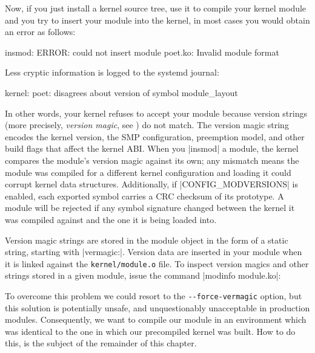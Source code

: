 \documentclass[10pt, oneside]{book}
\begin{document}
Now, if you just install a kernel source tree, use it to compile your kernel module and you try to insert your module into the kernel,
in most cases you would obtain an error as follows:

\begin{codebash}
insmod: ERROR: could not insert module poet.ko: Invalid module format
\end{codebash}

Less cryptic information is logged to the systemd journal:

\begin{codebash}
kernel: poet: disagrees about version of symbol module_layout
\end{codebash}

In other words, your kernel refuses to accept your module because version strings (more precisely, \textit{version magic}, see ) do not match.
The version magic string encodes the kernel version, the SMP configuration, preemption model, and other build flags that affect the kernel ABI.
When you \sh|insmod| a module, the kernel compares the module's version magic against its own; any mismatch means the module was compiled for a different kernel configuration and loading it could corrupt kernel data structures.
Additionally, if \cpp|CONFIG_MODVERSIONS| is enabled, each exported symbol carries a CRC checksum of its prototype. A module will be rejected if any symbol signature changed between the kernel it was compiled against and the one it is being loaded into.

Version magic strings are stored in the module object in the form of a static string, starting with \cpp|vermagic:|.
Version data are inserted in your module when it is linked against the \verb|kernel/module.o| file.
To inspect version magics and other strings stored in a given module, issue the command \sh|modinfo module.ko|:


To overcome this problem we could resort to the \verb|--force-vermagic| option, but this solution is potentially unsafe, and unquestionably unacceptable in production modules.
Consequently, we want to compile our module in an environment which was identical to the one in which our precompiled kernel was built.
How to do this, is the subject of the remainder of this chapter.
\end{document}
